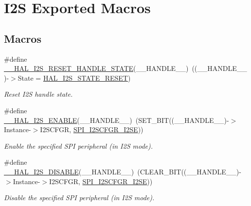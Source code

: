 \hypertarget{group___i2_s___exported__macros}{}\section{I2S Exported Macros}
\label{group___i2_s___exported__macros}
\subsection*{Macros}
\begin{DoxyCompactItemize}
\item 
\#define \hyperlink{group___i2_s___exported__macros_ga6c4a9d76f38d834137575776a5b7f60f}{\+\_\+\+\_\+\+H\+A\+L\+\_\+\+I2\+S\+\_\+\+R\+E\+S\+E\+T\+\_\+\+H\+A\+N\+D\+L\+E\+\_\+\+S\+T\+A\+TE}(\+\_\+\+\_\+\+H\+A\+N\+D\+L\+E\+\_\+\+\_\+)~((\+\_\+\+\_\+\+H\+A\+N\+D\+L\+E\+\_\+\+\_\+)-\/$>$State = \hyperlink{group___i2_s___exported___types_gga2588a0c71baf7cd6d2c1b9b11120bef0a2b69279eb021ef38d711edcdc5c95054}{H\+A\+L\+\_\+\+I2\+S\+\_\+\+S\+T\+A\+T\+E\+\_\+\+R\+E\+S\+ET})
\begin{DoxyCompactList}\small\item\em Reset I2S handle state. \end{DoxyCompactList}\item 
\#define \hyperlink{group___i2_s___exported__macros_ga4b5ca1e0e5bf616c99d38b8f0c5bdded}{\+\_\+\+\_\+\+H\+A\+L\+\_\+\+I2\+S\+\_\+\+E\+N\+A\+B\+LE}(\+\_\+\+\_\+\+H\+A\+N\+D\+L\+E\+\_\+\+\_\+)~(S\+E\+T\+\_\+\+B\+IT((\+\_\+\+\_\+\+H\+A\+N\+D\+L\+E\+\_\+\+\_\+)-\/$>$Instance-\/$>$I2\+S\+C\+F\+GR, \hyperlink{group___peripheral___registers___bits___definition_ga30d76c7552c91bbd5cbac70d9c56ebb3}{S\+P\+I\+\_\+\+I2\+S\+C\+F\+G\+R\+\_\+\+I2\+SE}))
\begin{DoxyCompactList}\small\item\em Enable the specified S\+PI peripheral (in I2S mode). \end{DoxyCompactList}\item 
\#define \hyperlink{group___i2_s___exported__macros_gac4f398db7f68fb8354bff61a9a6372b9}{\+\_\+\+\_\+\+H\+A\+L\+\_\+\+I2\+S\+\_\+\+D\+I\+S\+A\+B\+LE}(\+\_\+\+\_\+\+H\+A\+N\+D\+L\+E\+\_\+\+\_\+)~(C\+L\+E\+A\+R\+\_\+\+B\+IT((\+\_\+\+\_\+\+H\+A\+N\+D\+L\+E\+\_\+\+\_\+)-\/$>$Instance-\/$>$I2\+S\+C\+F\+GR, \hyperlink{group___peripheral___registers___bits___definition_ga30d76c7552c91bbd5cbac70d9c56ebb3}{S\+P\+I\+\_\+\+I2\+S\+C\+F\+G\+R\+\_\+\+I2\+SE}))
\begin{DoxyCompactList}\small\item\em Disable the specified S\+PI peripheral (in I2S mode). \end{DoxyCompactList}\item 

\end{DoxyCompactItemize}
